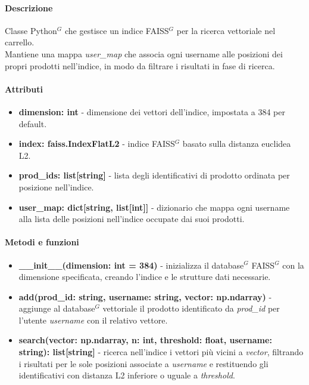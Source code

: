 \paragraph{Descrizione}
Classe Python$^G$ che gestisce un indice FAISS$^G$ per la ricerca vettoriale nel carrello.\\
Mantiene una mappa \textit{user\_map} che associa ogni username alle posizioni dei propri
prodotti nell'indice, in modo da filtrare i risultati in fase di ricerca.

\paragraph{Attributi}
\begin{itemize}
	\item \textbf{dimension: int} - dimensione dei vettori dell'indice, impostata a 384
		per default.
	\item \textbf{index: faiss.IndexFlatL2} - indice FAISS$^G$ basato sulla distanza
		euclidea L2.
	\item \textbf{prod\_ids: list[string]} - lista degli identificativi di prodotto
		ordinata per posizione nell'indice.
	\item \textbf{user\_map: dict[string, list[int]]} - dizionario che mappa ogni
		username alla lista delle posizioni nell'indice occupate dai suoi prodotti.
\end{itemize}

\paragraph{Metodi e funzioni}
\begin{itemize}
	\item \textbf{\_\_init\_\_(dimension: int = 384)} - inizializza il database$^G$ FAISS$^G$
		con la dimensione specificata, creando l'indice e le strutture dati necessarie.
	\item \textbf{add(prod\_id: string, username: string, vector: np.ndarray)} -
		aggiunge al database$^G$ vettoriale il prodotto identificato da \textit{prod\_id}
		per l'utente \textit{username} con il relativo vettore.
	\item \textbf{search(vector: np.ndarray, n: int, threshold: float, username: string):
		list[string]} - ricerca nell'indice i vettori più vicini a \textit{vector},
		filtrando i risultati per le sole posizioni associate a \textit{username} e
		restituendo gli identificativi con distanza L2 inferiore o uguale a
		\textit{threshold}.
\end{itemize}

